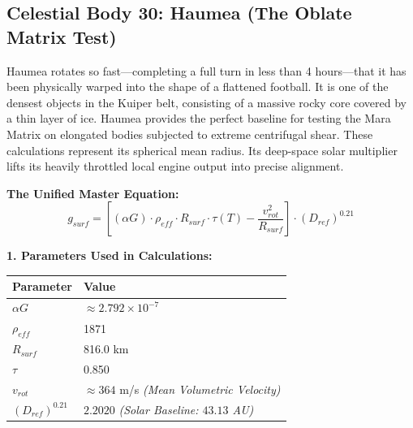 \documentclass[11pt, a4paper]{article}
\begin{document}
\clearpage
\subsection{Celestial Body 30: Haumea (The Oblate Matrix Test)}
  Haumea rotates so fast—completing a full turn in less than 4 hours—that it has been physically warped into the shape of a flattened football. It is one of the densest objects in the Kuiper belt, consisting of a massive rocky core covered by a thin layer of ice. Haumea provides the perfect baseline for testing the Mara Matrix on elongated bodies subjected to extreme centrifugal shear. These calculations represent its spherical mean radius. Its deep-space solar multiplier lifts its heavily throttled local engine output into precise alignment.

  \vspace{0.5em}
  \noindent \textbf{The Unified Master Equation:}
  $$ g_{surf} = \left[ (\alpha G) \cdot \rho_{eff} \cdot R_{surf} \cdot \tau(T) - \frac{v_{rot}^2}{R_{surf}} \right] \cdot (D_{ref})^{0.21} $$

  \vspace{0.5em}
  \noindent \textbf{1. Parameters Used in Calculations:} \\[0.5em]
  \begingroup
  \renewcommand{\arraystretch}{1.3}
  \hspace*{2em}
  \begin{tabular}{|l|l|}
    \hline
    \textbf{Parameter} & \textbf{Value} \\ \hline
    $\alpha G$ & $\approx 2.792 \times 10^{-7}$ \\ \hline
    $\rho_{eff}$ & 1871 \\ \hline
    $R_{surf}$ & 816.0 km \\ \hline
    $\tau$ & 0.850 \\ \hline
    $v_{rot}$ & $\approx 364$ m/s \textit{(Mean Volumetric Velocity)} \\ \hline
    $(D_{ref})^{0.21}$ & $2.2020$ \textit{(Solar Baseline: $43.13$ AU)} \\ \hline
  \end{tabular}
  \endgroup
\end{document}
